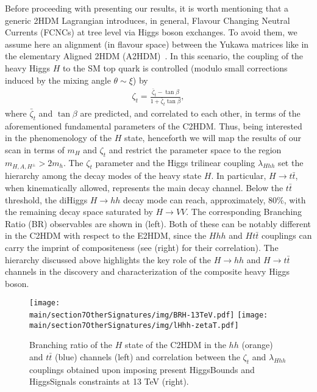 Before proceeding with presenting our results, it is worth mentioning that a generic 2HDM Lagrangian 
introduces, in general, Flavour Changing Neutral Currents (FCNCs) at tree level via Higgs boson exchanges.
To avoid them, we assume here an alignment (in flavour space) between the Yukawa matrices like in the elementary Aligned 2HDM (A2HDM)~\cite{Pich:2009sp}. 
In this scenario, the coupling of the heavy Higgs $H$ to the SM top quark is controlled (modulo small corrections induced by the mixing angle $\theta \sim  \xi$) by
\begin{align}\label{eq:A2HDM}
\zeta_t=\frac{{\bar\zeta}_t-\tan\beta}{1+{\bar\zeta}_t\tan\beta},
\end{align}
where ${\bar\zeta}_t$ and $\tan\beta$ are predicted, and correlated to each other, in terms of the aforementioned fundamental parameters of the C2HDM.
Thus, being interested in the phenomenology of the $H$ state, henceforth we will map the results of our scan in terms of $m_H$ and $\zeta_t$ and restrict the parameter space to the region $m_{H,A,H^\pm} >2 m_h$.
The $\zeta_t$ parameter and the Higgs trilinear coupling $\lambda_{Hhh}$ set the hierarchy among the decay modes of the heavy state $H$. In particular, $H \rightarrow t \bar t$, when kinematically allowed, represents the main decay channel. Below the $t \bar t$ threshold, the diHiggs $H \rightarrow hh$ decay mode can reach, approximately, 80\%, with the remaining decay space saturated by $H \rightarrow VV$. 
The corresponding Branching Ratio (BR) observables are shown in  (left). Both of these can be notably different in the C2HDM with respect to the E2HDM, since the $Hhh$ and $Ht\bar t$ couplings can carry the imprint of compositeness (see   (right) for their correlation).
The hierarchy discussed above highlights the key role of the $H \rightarrow hh$ and $H \rightarrow t \bar t$ channels in the discovery and characterization of the composite heavy Higgs boson.
 \begin{figure}
\centering
{\texttt{[image: \\main/section7OtherSignatures/img/BRH-13TeV.pdf]}} \quad
{\texttt{[image: \\main/section7OtherSignatures/img/lHhh-zetaT.pdf]}}
\caption{Branching ratio of the $H$ state of the C2HDM in the $hh$ (orange) and $t\bar t$ (blue) channels (left) and correlation between the $\zeta_t$ and $\lambda_{Hhh}$ couplings obtained upon imposing present HiggsBounds and HiggsSignals constraints at 13 TeV (right). 
\label{fig:BRs}}
\end{figure}


